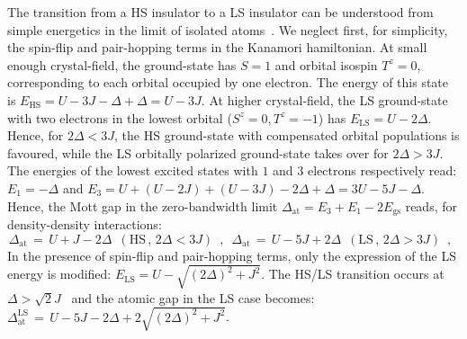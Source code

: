 \documentclass[]{ar2e-changed}%
\def\hn{\hat{n}}
\def\spinup{\uparrow}
\def\spindown{\downarrow}
\def\mp{m^\prime}
\begin{document}
The transition from a HS insulator to a LS insulator can be understood from simple energetics 
in the limit of isolated atoms~\cite{kunes_review_epjst_2009,kunes_HS_LS_prl_2011}. 
%
We neglect first, for simplicity, the spin-flip and pair-hopping  terms in 
the Kanamori hamiltonian. 
%
At small enough crystal-field, the ground-state has $S=1$ and orbital 
isospin $T^z=0$, corresponding to each orbital occupied by one electron. The energy of this 
state is $E_{\mathrm{HS}}=U-3J-\Delta+\Delta=U-3J$. At higher crystal-field, the LS  
ground-state with two electrons in the lowest orbital ($S^z=0,T^z=-1$) has $E_{\mathrm{LS}}=U-2\Delta$. 
%
Hence, for $2\Delta<3J$, the HS ground-state with compensated orbital populations is favoured, 
while the LS orbitally polarized ground-state takes over for $2\Delta>3J$. 
%
%
The energies of the lowest excited states with $1$ and  $3$ electrons respectively read: 
$E_1=-\Delta$ and $E_3=U+(U-2J)+(U-3J)-2\Delta+\Delta=3U-5J-\Delta$. Hence, the Mott gap in the zero-bandwidth limit  
$\Delta_{\mathrm{at}}=E_3+E_1-2E_{\mathrm{gs}}$ reads, for density-density interactions:
\begin{equation}
\Delta_{\mathrm{at}}\,=\,U+J-2\Delta\,\,\,(\mathrm{HS}\,,\,2\Delta<3J)\,\,\,,\,\,\,
\Delta_{\mathrm{at}}\,=\,U-5J+2\Delta\,\,\,(\mathrm{LS}\,,\,2\Delta>3J)\,\,\,,\,\,\,
\label{eq:mottgap_CF}
\end{equation}
In the presence of spin-flip and pair-hopping terms, only the expression of the LS energy is modified: 
$E_{\mathrm{LS}}=U-\sqrt{(2\Delta)^2+J^2}$. The HS/LS transition occurs at $\Delta>\sqrt{2}J$~\cite{werner07_hilowspin}  and 
the atomic gap in the LS case becomes: $\Delta^{\mathrm{LS}}_{\mathrm{at}}\,=\,U-5J-2\Delta+2\sqrt{(2\Delta)^2+J^2}$. 
\end{document}
